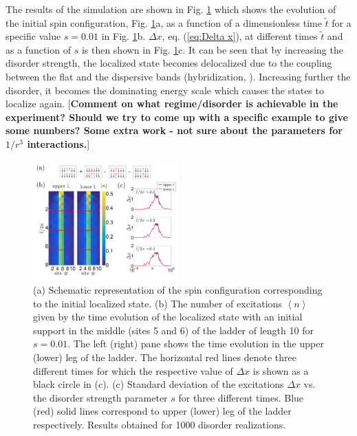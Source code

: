 \documentclass[prl,aps,twocolumn,showpacs,superscriptaddress,longbibliography]{revtex4-1}
\newcommand{\lan}{\left\langle}
\newcommand{\ran}{\right\rangle}
\newcommand{\av}[1]{\lan #1 \ran}
\begin{document}
The results of the simulation are shown in Fig. \ref{Fig:time evolution} which shows the evolution of the initial spin configuration, Fig. \ref{Fig:time evolution}a, as a function of a dimensionless time $\tilde{t}$ for a specific value $s=0.01$ in Fig. \ref{Fig:time evolution}b. $\Delta x$, eq. (\ref{eq:Delta x}), at different times $\tilde{t}$ and as a function of $s$ is then shown in Fig. \ref{Fig:time evolution}c. It can be seen that by increasing the disorder strength, the localized state becomes delocalized due to the coupling between the flat and the dispersive bands (hybridization, \cite{Leykam2017}). Increasing further the disorder, it becomes the dominating energy scale which causes the states to localize again. [{\bf Comment on what regime/disorder is achievable in the experiment? Should we try to come up with a specific example to give some numbers? Some extra work - not sure about the parameters for $1/r^3$ interactions.}]

\begin{figure}

	      \includegraphics[width=0.5\textwidth]{graphics/time_evolution_CLS_PaperSupport_v2.pdf}
		\caption{(a) Schematic representation of the spin configuration corresponding to the initial localized state. (b) The number of excitations $\av{n}$ given by the time evolution of the localized state with an initial support in the middle (sites 5 and 6) of the ladder of length 10 for $s=0.01$. The left (right) pane shows the time evolution in the upper (lower) leg of the ladder. The horizontal red lines denote three different times for which the respective value of $\Delta x$ is shown as a black circle in (c). (c) Standard deviation of the excitations $\Delta x$ vs. the disorder strength parameter $s$ for three different times. Blue (red) solid lines correspond to upper (lower) leg of the ladder respectively. Results obtained for 1000 disorder realizations.}

 \label{Fig:time evolution}
   
\end{figure}  
\end{document}
